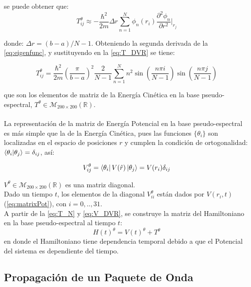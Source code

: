 se puede obtener que: \cite{Tannor:2006}\cite{Colbert1992}
\begin{equation}
  \label{eq:T_DVR}
  T^{\theta}_{ij}\approx -\frac{\hbar^2}{2m}\Delta r\sum_{n=1}^{N}\phi_n(r_i)\frac{\partial^2\phi_n}{\partial r^2}\biggr\rvert_{r_j}
\end{equation}

donde: $\Delta r = (b-a)/N-1$. Obteniendo la segunda derivada de la \autoref{eq:eigenfunc}, y sustituyendo en la \autoref{eq:T_DVR} se tiene:

\begin{equation}
  \label{eq:T_N}
  T^{\theta}_{ij}=\frac{\hbar^2}{2m}\left(\frac{\pi}{b-a} \right)^2\frac{2}{N-1}\sum_{n=1}^Nn^2\sin\left(\frac{n\pi i}{N-1} \right)\sin\left(\frac{n\pi j}{N-1} \right)
\end{equation}

que son los elementos de matriz de la Energía Cinética en la base pseudo-espectral, $T^{\theta}\in \mathcal{M}_{200\times200}(\mathbb{R})$.
\\
\\
La representación de la matriz de Energía Potencial en la base pseudo-espectral es más simple que la de la Energía Cinética, pues 
las funciones $\{\theta_i\}$ son localizadas en el espacio de posiciones $r$ y cumplen la condición de ortogonalidad: $\bra{\theta_i}\ket{\theta_j}= \delta_{ij}$, así:

\begin{equation}
  \label{eq:V_DVR}
  V^{\theta}_{ij}= \bra{\theta_i}V(\hat{r})\ket{\theta_j}=V(r_i)\delta_{ij}
\end{equation}

$V^{\theta}\in \mathcal{M}_{200\times200}(\mathbb{R})$ es una matriz diagonal.
\\
Dado un tiempo $t$, los elementos de la diagonal $V^{\theta}_{ii}$ están dados por $V(r_i,t)$ (\autoref{eq:matrixPot}), con $i=0,..,31$.
\\
A partir de la \autoref{eq:T_N} y \autoref{eq:V_DVR}, se construye la matriz del Hamiltoniano en la base pseudo-espectral al tiempo $t$:
\begin{equation}
  \label{eq:H_DVR}
  H(t)^{\theta} = V(t)^{\theta}+T^{\theta}
\end{equation}
en donde el Hamiltoniano tiene dependencia temporal debido a que el Potencial del sistema es dependiente del tiempo.

\subsection{Propagación de un Paquete de Onda}

